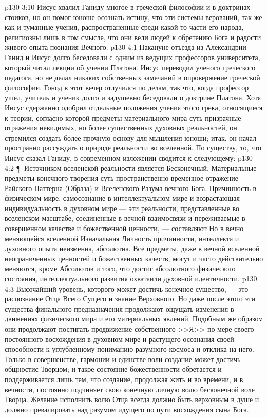 \vs p130 3:10 Иисус хвалил Ганиду многое в греческой философии и в доктринах стоиков, но он помог юноше осознать истину, что эти системы верований, так же как и туманные учения, распространенные среди какой\hyp{}то части его народа, религиозны лишь в том смысле, что они вели людей к обретению Бога и радости живого опыта познания Вечного.
\vs p130 4:1 Накануне отъезда из Александрии Ганид и Иисус долго беседовали с одним из ведущих профессоров университета, который читал лекции об учении Платона. Иисус переводил ученого греческого педагога, но не делал никаких собственных замечаний в опровержение греческой философии. Гонод в этот вечер отлучился по делам, так что, когда профессор ушел, учитель и ученик долго и задушевно беседовали о доктрине Платона. Хотя Иисус сдержанно одобрил отдельные положения учения этого грека, относящиеся к теории, согласно которой предметы материального мира суть призрачные отражения невидимых, но более существенных духовных реальностей, он стремился создать более прочную основу для мышления юноши; итак, он начал пространно рассуждать о природе реальности во вселенной. По существу, то, что Иисус сказал Ганиду, в современном изложении сводится к следующему:
\vs p130 4:2 \P\ Источником вселенской реальности является Бесконечный. Материальные предметы конечного творения суть пространственно\hyp{}временное отражение Райского Паттерна (Образа) и Вселенского Разума вечного Бога. Причинность в физическом мире, самосознание в интеллектуальном мире и возрастающая индивидуальность в духовном мире --- эти реальности, представленные во вселенском масштабе, соединенные в вечной взаимосвязи и переживаемые в совершенном качестве и божественной ценности, --- составляют  Но в вечно меняющейся вселенной Изначальная Личность причинности, интеллекта и духовного опыта неизменна, абсолютна. Все предметы, даже в вечной вселенной неограниченных ценностей и божественных качеств, могут и часто действительно меняются, кроме Абсолютов и того, что достиг абсолютного физического состояния, интеллектуального развития охватаили духовной идентичности.
\vs p130 4:3 Высочайший уровень, которого может достичь конечное существо, --- это распознание Отца Всего Сущего и знание Верховного. Но даже после этого эти существа финального предназначения продолжают ощущать изменения в движениях физического мира и его материальных явлений. Подобным же образом они продолжают постигать продвижение собственного >>Я>> по мере своего постоянного восхождения в духовном мире и растущего осознания своей способности к углубленному пониманию разумного космоса и отклика на него. Только в совершенстве, гармонии и единстве воли создание может достичь общностис Творцом; и такое состояние божественности обретается и поддерживается лишь тем, что создание, продолжая жить и во времени, и в вечности, постоянно подчиняет свою конечную личную волю бесконечной воле Творца. Желание исполнить волю Отца всегда должно быть верховным в душе и должно превалировать над разумом идущего по пути восхождения сына Бога.

